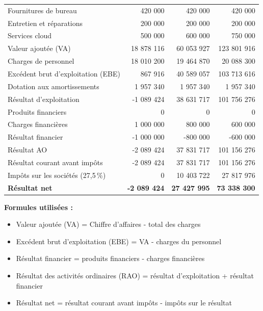 \begin{xltabular}{\textwidth}{@{} X r r r @{}}
Fournitures de bureau & 420 000 & 420 000 & 420 000 \\
Entretien et réparations & 200 000 & 200 000 & 200 000 \\
Services cloud & 500 000 & 600 000 & 750 000 \\
\midrule
Valeur ajoutée (VA) & 18 878 116 & 60 053 927 & 123 801 916 \\
Charges de personnel & 18 010 200 & 19 464 870 & 20 088 300 \\
Excédent brut d’exploitation (EBE) & 867 916 & 40 589 057 & 103 713 616 \\
\midrule
{}Dotation aux amortissements & 1 957 340 & 1 957 340 & 1 957 340 \\
Résultat d’exploitation & -1 089 424 & 38 631 717 & 101 756 276 \\
Produits financiers & 0 & 0 & 0 \\
Charges financières & 1 000 000 & 800 000 & 600 000 \\
Résultat financier & -1 000 000 & -800 000 & -600 000 \\
Résultat AO & -2 089 424 & 37 831 717 & 101 156 276 \\
\midrule
{}Résultat courant avant impôts & -2 089 424 & 37 831 717 & 101 156 276 \\
Impôts sur les sociétés (27,5\,\%) & 0 & 10 403 722 & 27 817 976 \\
\midrule
\textbf{Résultat net} & \textbf{-2 089 424} & \textbf{27 427 995} & \textbf{73 338 300} \\
\end{xltabular}

\textbf{Formules utilisées :}
\begin{itemize}
    \item Valeur ajoutée (VA) = Chiffre d’affaires - total des charges
    \item Excédent brut d’exploitation (EBE) = VA - charges du personnel
    \item Résultat financier = produits financiers - charges financières
    \item Résultat des activités ordinaires (RAO) = résultat d’exploitation + résultat financier
    \item Résultat net = résultat courant avant impôts - impôts sur le résultat
\end{itemize}


